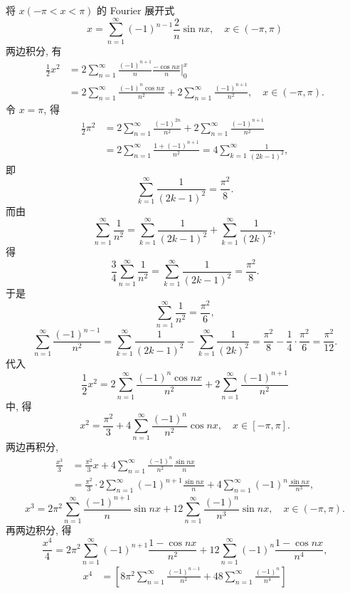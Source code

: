 \begin{solution}[证法 2]
将 $x(-\pi<x<\pi)$ 的 Fourier 展开式
\[
  x=\sum_{n=1}^{\infty}(-1)^{n-1}\frac{2}{n}\sin n x,\quad x\in(-\pi,\pi)
\]
两边积分, 有
\[
  \begin{aligned}
    \frac{1}{2}x^{2}&=2\sum_{n=1}^{\infty}\frac{(-1)^{n+1}}{n}\left.\frac{-\cos nx}{n}\right|_{0}^{x}\\
    &=2\sum_{n=1}^{\infty}\frac{(-1)^{n}\cos nx}{n^{2}}+2\sum_{n=1}^{\infty}\frac{(-1)^{n+1}}{n^{2}},\quad x\in(-\pi,\pi).
  \end{aligned}
\]
令 $x=\pi$, 得
\[
  \begin{aligned}
    \frac{1}{2}\pi^{2}&=2\sum_{n=1}^{\infty}\frac{(-1)^{2n}}{n^{2}}+2\sum_{n=1}^{\infty}\frac{(-1)^{n+1}}{n^{2}}\\
    &=2\sum_{n=1}^{\infty}\frac{1+(-1)^{n+1}}{n^{2}}=4\sum_{k=1}^{\infty}\frac{1}{(2k-1)^{2}},
  \end{aligned}
\]
即
\[
  \sum_{k=1}^{\infty}\frac{1}{(2k-1)^{2}}=\frac{\pi^{2}}{8}.
\]
而由
\[
  \sum_{n=1}^{\infty}\frac{1}{n^{2}}=\sum_{k=1}^{\infty}\frac{1}{(2k-1)^{2}}+\sum_{k=1}^{\infty}\frac{1}{(2k)^{2}},
\]
得
\[
  \frac{3}{4}\sum_{n=1}^{\infty}\frac{1}{n^{2}}=\sum_{k=1}^{\infty}\frac{1}{(2k-1)^{2}}=\frac{\pi^{2}}{8}.
\]
于是
\[
  \sum_{n=1}^{\infty}\frac{1}{n^{2}}=\frac{\pi^{2}}{6},
\]
\[
  \sum_{n=1}^{\infty}\frac{(-1)^{n-1}}{n^{2}}=\sum_{k=1}^{\infty}\frac{1}{(2k-1)^{2}}-\sum_{k=1}^{\infty}\frac{1}{(2k)^{2}}=\frac{\pi^{2}}{8}-\frac{1}{4}\cdot\frac{\pi^{2}}{6}=\frac{\pi^{2}}{12}.
\]
代入
\[
  \frac{1}{2}x^{2}=2\sum_{n=1}^{\infty}\frac{(-1)^{n}\cos nx}{n^{2}}+2\sum_{n=1}^{\infty}\frac{(-1)^{n+1}}{n^{2}}
\]
中, 得
\[
  x^{2}=\frac{\pi^{2}}{3}+4\sum_{n=1}^{\infty}\frac{(-1)^{n}}{n^{2}}\cos nx,\quad x\in[-\pi,\pi].
\]
两边再积分,
\[
  \begin{aligned}
    \frac{x^{3}}{3}&=\frac{\pi^{2}}{3}x+4\sum_{n=1}^{\infty}\frac{(-1)^{n}}{n^{2}}\frac{\sin nx}{n}\\
    &=\frac{\pi^{2}}{3}\cdot2\sum_{n=1}^{\infty}(-1)^{n+1}\frac{\sin nx}{n}+4\sum_{n=1}^{\infty}(-1)^{n}\frac{\sin nx}{n^{3}},
  \end{aligned}
\]
\[
  x^{3}=2\pi^{2}\sum_{n=1}^{\infty}\frac{(-1)^{n+1}}{n}\sin n x+12\sum_{n=1}^{\infty}\frac{(-1)^{n}}{n^{3}}\sin n x,\quad x\in(-\pi,\pi).
\]
再两边积分, 得
\[
  \frac{x^{4}}{4}=2\pi^{2}\sum_{n=1}^{\infty}(-1)^{n+1}\frac{1-\cos nx}{n^{2}}+12\sum_{n=1}^{\infty}(-1)^{n}\frac{1-\cos nx}{n^{4}},
\]
\[
  \begin{aligned}
    x^{4}&=\left[8\pi^{2}\sum_{n=1}^{\infty}\frac{(-1)^{n-1}}{n^{2}}+48\sum_{n=1}^{\infty}\frac{(-1)^{n}}{n^{4}}\right]\\

\end{aligned}\]
\end{solution}
